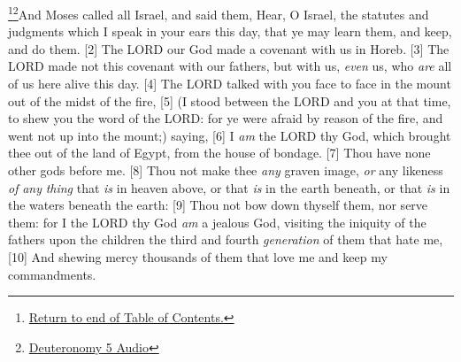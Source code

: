 \footnote{\textcolor[cmyk]{0.99998,1,0,0}{\hyperlink{TOC}{Return to end of Table of Contents.}}}\footnote{\href{https://audiobible.com/bible/deuteronomy_5.html}{\textcolor[cmyk]{0.99998,1,0,0}{Deuteronomy 5 Audio}}}\textcolor[cmyk]{0.99998,1,0,0}{And Moses   {called all Israel}, and said   them, Hear, O Israel, the statutes and judgments which I speak in your ears this day, that ye may   {learn} them, and   {keep}, and   {do} them.}\marginpar{\scriptsize \textcolor[rgb]{0.00,0.545,0.269}{$\rightarrow$A progression: 
\begin{compactenum}
	\item hear,
	\item learn,
	\item keep,
	\item do,
\end{compactenum}}}
[2] \textcolor[cmyk]{0.99998,1,0,0}{The LORD our God made a   {covenant} with us in Horeb.}
[3] \textcolor[cmyk]{0.99998,1,0,0}{The LORD made not this   {covenant} with our fathers, but with us, \emph{even} us, who \emph{are} all of us here alive this day.}
[4] \textcolor[cmyk]{0.99998,1,0,0}{The LORD talked with you face to face in the mount out of the midst of the fire,}
[5] \textcolor[cmyk]{0.99998,1,0,0}{(I stood between the LORD and you at that time, to shew you the word of the LORD: for ye were afraid by reason of the fire, and went not up into the mount;) saying,}
[6] \textcolor[cmyk]{0.99998,1,0,0}{I \emph{am} the LORD thy God, which brought thee out of the land of Egypt, from the house of bondage.}
[7] \textcolor[cmyk]{0.99998,1,0,0}{Thou   have   {none other gods} before me.}
[8] \textcolor[cmyk]{0.99998,1,0,0}{Thou   not make thee \emph{any}   {graven image}, \emph{or} any likeness \emph{of} \emph{any} \emph{thing} that \emph{is} in heaven above, or that \emph{is} in the earth beneath, or that \emph{is} in the waters beneath the earth:}
[9] \textcolor[cmyk]{0.99998,1,0,0}{Thou   not bow down thyself   them, nor serve them: for I the LORD thy God \emph{am} a jealous God, visiting the iniquity of the fathers upon the children   the third and fourth \emph{generation} of them that hate me,}
[10] \textcolor[cmyk]{0.99998,1,0,0}{And shewing mercy   thousands of them that love me and keep my commandments.}
